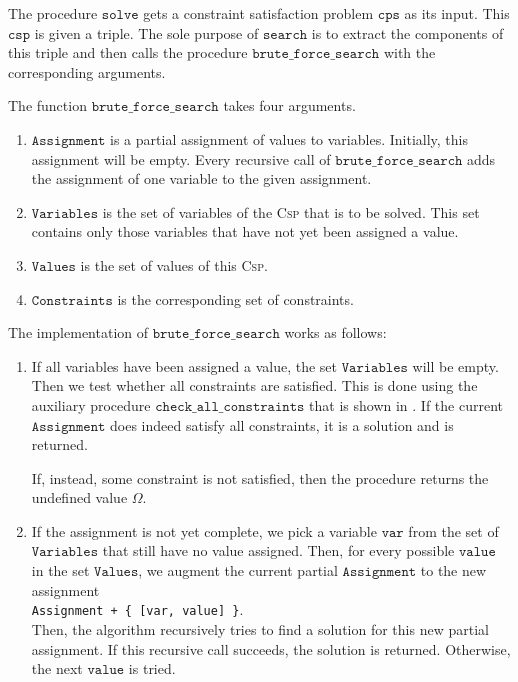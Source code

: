 The procedure $\mathtt{solve}$ gets a constraint satisfaction problem $\mathtt{cps}$ as its input.  
This $\mathtt{csp}$ is given a triple.  The sole purpose of $\mathtt{search}$ is to extract the components
of this triple and then calls the procedure $\mathtt{brute\_force\_search}$ with the corresponding arguments.

The function $\mathtt{brute\_force\_search}$ takes four arguments.
\begin{enumerate}
\item $\mathtt{Assignment}$ is a partial assignment of values to variables.
      Initially, this assignment will be empty.  Every recursive call of
      $\mathtt{brute\_force\_search}$ adds the assignment of one variable to the given assignment.
\item $\mathtt{Variables}$ is the set of variables of the \textsc{Csp} that is to be solved.
      This set contains only those variables that have not yet been assigned a value.
\item $\mathtt{Values}$ is the set of values of this \textsc{Csp}.
\item $\mathtt{Constraints}$ is the corresponding set of constraints.
\end{enumerate}
The implementation of $\mathtt{brute\_force\_search}$ works as follows:
\begin{enumerate}
\item If all variables have been assigned a value, the set $\mathtt{Variables}$ will be empty.
      Then we test whether all constraints are satisfied.  This is done using the auxiliary
      procedure $\mathtt{check\_all\_constraints}$ that is shown in .
      If the current $\mathtt{Assignment}$ does indeed satisfy all constraints, it is a solution and
      is returned.

      If, instead, some constraint is not satisfied, then the procedure returns the undefined value $\Omega$.
\item If the assignment is not yet complete, we pick a variable $\mathtt{var}$ from the set of
      $\mathtt{Variables}$ that still have no value assigned.  Then, for every possible
      $\mathtt{value}$ in the set $\mathtt{Values}$, we augment the current partial
      $\mathtt{Assignment}$ to the new assignment
      \\[0.2cm]
      \hspace*{1.3cm}
      \texttt{Assignment + \{ [var, value] \}}.
      \\[0.2cm]
      Then, the algorithm recursively tries to find a solution for this new partial assignment.
      If this recursive call succeeds, the solution is returned.  Otherwise, the next
      $\mathtt{value}$ is tried.
\end{enumerate}


